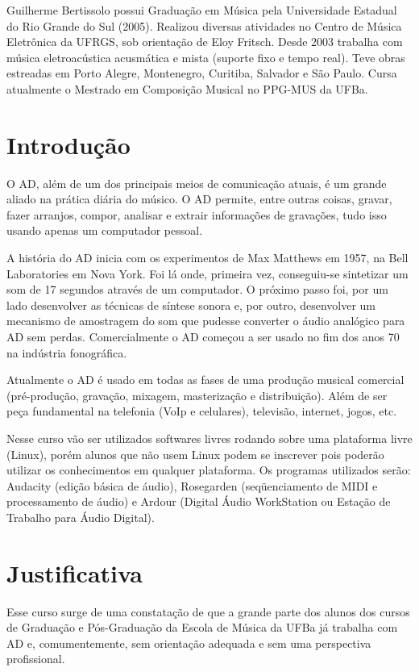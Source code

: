 \documentclass{article}
\begin{document}
Guilherme Bertissolo possui Graduação em Música pela Universidade
Estadual do Rio Grande do Sul (2005). Realizou diversas atividades no
Centro de Música Eletrônica da UFRGS, sob orientação de Eloy
Fritsch. Desde 2003 trabalha com música eletroacústica acusmática e
mista (suporte fixo e tempo real). Teve obras estreadas em Porto
Alegre, Montenegro, Curitiba, Salvador e São Paulo. Cursa atualmente o
Mestrado em Composição Musical no PPG-MUS da UFBa.


\section{Introdução}

O AD, além de um dos principais meios de comunicação atuais, é um
grande aliado na prática diária do músico. O AD permite, entre outras
coisas, gravar, fazer arranjos, compor, analisar e extrair informações
de gravações, tudo isso usando apenas um computador pessoal.

A história do AD inicia com os experimentos de Max Matthews em 1957,
na Bell Laboratories em Nova York. Foi lá onde, primeira vez,
conseguiu-se sintetizar um som de 17 segundos através de um
computador. O próximo passo foi, por um lado desenvolver as técnicas
de síntese sonora e, por outro, desenvolver um mecanismo de amostragem
do som que pudesse converter o áudio analógico para AD sem
perdas. Comercialmente o AD começou a ser usado no fim dos anos 70 na
indústria fonográfica.

Atualmente o AD é usado em todas as fases de uma produção
musical comercial (pré-produção, gravação, mixagem, masterização e
distribuição). Além de ser peça fundamental na telefonia (VoIp e
celulares), televisão, internet, jogos, etc.

Nesse curso vão ser utilizados softwares livres rodando sobre uma
plataforma livre (Linux), porém alunos que não usem Linux podem se
inscrever pois poderão utilizar os conhecimentos em qualquer
plataforma.  Os programas utilizados serão: Audacity (edição básica de
áudio), Rosegarden (seqüenciamento de MIDI e processamento de áudio) e
Ardour (Digital Áudio WorkStation ou Estação de Trabalho para Áudio Digital).

\section{Justificativa}

Esse curso surge de uma constatação de que a grande parte dos alunos
dos cursos de Graduação e Pós-Graduação da Escola de Música da UFBa já
trabalha com AD e, comumentemente, sem orientação adequada e sem uma
perspectiva profissional.
\end{document}
